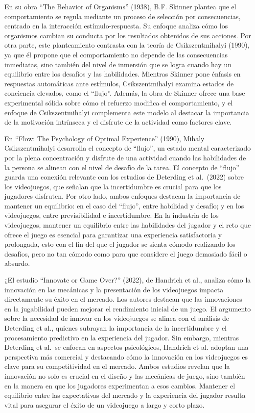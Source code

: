 \documentclass[
  letterpaper,
  DIV=11,
  numbers=noendperiod]{scrreprt}
\begin{document}
En su obra ``The Behavior of Organisms'' (1938), B.F. Skinner plantea
que el comportamiento se regula mediante un proceso de selección por
consecuencias, centrado en la interacción estímulo-respuesta. Su enfoque
analiza cómo los organismos cambian su conducta por los resultados
obtenidos de sus acciones. Por otra parte, este planteamiento contrasta
con la teoría de Csikszentmihalyi (1990), ya que él propone que el
comportamiento no depende de las consecuencias inmediatas, sino también
del nivel de inmersión que se logra cuando hay un equilibrio entre los
desafíos y las habilidades. Mientras Skinner pone énfasis en respuestas
automáticas ante estímulos, Csikszentmihalyi examina estados de
conciencia elevados, como el ``flujo''. Además, la obra de Skinner
ofrece una base experimental sólida sobre cómo el refuerzo modifica el
comportamiento, y el enfoque de Csikszentmihalyi complementa este modelo
al destacar la importancia de la motivación intrínseca y el disfrute de
la actividad como factores clave.

En ``Flow: The Psychology of Optimal Experience'' (1990), Mihaly
Csikszentmihalyi desarrolla el concepto de ``flujo'', un estado mental
caracterizado por la plena concentración y disfrute de una actividad
cuando las habilidades de la persona se alinean con el nivel de desafío
de la tarea. El concepto de ``flujo'' guarda una conexión relevante con
los estudios de Deterding et al.~(2022) sobre los videojuegos, que
señalan que la incertidumbre es crucial para que los jugadores
disfruten. Por otro lado, ambos enfoques destacan la importancia de
mantener un equilibrio: en el caso del ``flujo'', entre habilidad y
desafío; y en los videojuegos, entre previsibilidad e incertidumbre. En
la industria de los videojuegos, mantener un equilibrio entre las
habilidades del jugador y el reto que ofrece el juego es esencial para
garantizar una experiencia satisfactoria y prolongada, esto con el fin
del que el jugador se sienta cómodo realizando los desafíos, pero no tan
cómodo como para que considere el juego demasiado fácil o absurdo.

¿El estudio ``Innovate or Game Over?'' (2022), de Handrich et al.,
analiza cómo la innovación en las mecánicas y la presentación de los
videojuegos impacta directamente su éxito en el mercado. Los autores
destacan que las innovaciones en la jugabilidad pueden mejorar el
rendimiento inicial de un juego. El argumento sobre la necesidad de
innovar en los videojuegos se alinea con el análisis de Deterding et
al., quienes subrayan la importancia de la incertidumbre y el
procesamiento predictivo en la experiencia del jugador. Sin embargo,
mientras Deterding et al.~se enfocan en aspectos psicológicos, Handrich
et al. adoptan una perspectiva más comercial y destacando cómo la
innovación en los videojuegos es clave para su competitividad en el
mercado. Ambos estudios revelan que la innovación no solo es crucial en
el diseño y las mecánicas de juego, sino también en la manera en que los
jugadores experimentan a esos cambios. Mantener el equilibrio entre las
expectativas del mercado y la experiencia del jugador resulta vital para
asegurar el éxito de un videojuego a largo y corto plazo.
\end{document}
